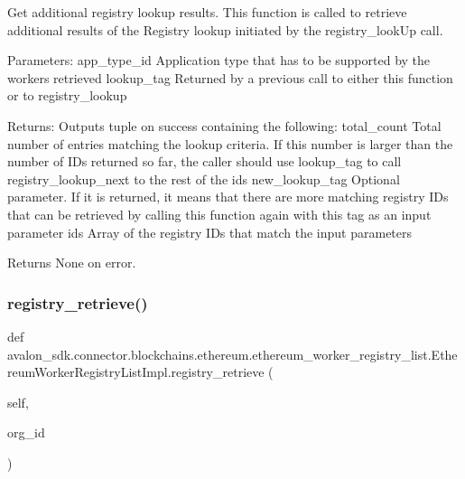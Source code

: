 \begin{DoxyVerb}Get additional registry lookup results.
This function is called to retrieve additional results of the
Registry lookup initiated by the registry_lookUp call.

Parameters:
app_type_id    Application type that has to be
       supported by the workers retrieved
lookup_tag     Returned by a previous call to either this
       function or to registry_lookup

Returns:
Outputs tuple on success containing the following:
total_count    Total number of entries matching the lookup
       criteria. If this number is larger than the number
       of IDs returned so far, the caller should use
       lookup_tag to call registry_lookup_next to
       the rest of the ids
new_lookup_tag Optional parameter. If it is returned, it means
       that there are more matching registry IDs that
       can be retrieved by calling this function again
       with this tag as an input parameter
ids            Array of the registry IDs that match the input
       parameters

Returns None on error.
\end{DoxyVerb}
 \mbox{\label{classavalon__sdk_1_1connector_1_1blockchains_1_1ethereum_1_1ethereum__worker__registry__list_1_1EthereumWorkerRegistryListImpl_a9d885ff695a2d6125222eb3e8529c81b}} 
\subsubsection{\texorpdfstring{registry\+\_\+retrieve()}{registry\_retrieve()}}
{\footnotesize\ttfamily def avalon\+\_\+sdk.\+connector.\+blockchains.\+ethereum.\+ethereum\+\_\+worker\+\_\+registry\+\_\+list.\+Ethereum\+Worker\+Registry\+List\+Impl.\+registry\+\_\+retrieve (\begin{DoxyParamCaption}\item[{}]{self,  }\item[{}]{org\+\_\+id }\end{DoxyParamCaption})}

